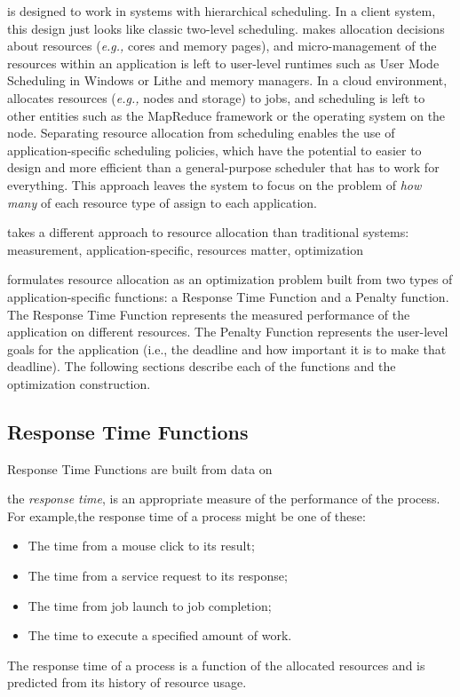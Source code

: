 \pacora is designed to work in systems with hierarchical scheduling.  In a client system, this design just looks like classic two-level scheduling.  \pacora makes allocation decisions about resources (\emph{e.g.,} cores and memory pages), and micro-management of the resources within an application is left to user-level runtimes such as User Mode Scheduling in Windows\cite{um_sched} or Lithe\cite{lithe} and memory managers.  In a cloud environment, \pacora allocates resources (\emph{e.g.,} nodes and storage) to jobs, and scheduling is left to other entities such as the MapReduce framework\cite{mapreduce} or the operating system on the node.  Separating resource allocation from scheduling enables the use of application-specific scheduling policies, which have the potential to easier to design and more efficient than a general-purpose scheduler that has to work for everything.   This approach leaves the system to focus on the problem of \emph{how many} of each resource type of assign to each application. 

 
\pacora takes a different approach to resource allocation than traditional systems: measurement, application-specific, resources matter, optimization 


\pacora formulates resource allocation as an optimization problem built from two types of application-specific functions: a Response Time Function and a Penalty function. The Response Time Function represents the measured performance of the application on different resources.  The Penalty Function represents the user-level goals for the application (i.e., the deadline and how important it is to make that deadline). The following sections describe each of the functions and the optimization construction.

\subsection*{Response Time Functions}

Response Time Functions are built from data on 

 the \emph{response time},
    is an appropriate measure of the performance of the process.
    For example,the response time of a process might be one of these:
    \begin{itemize}[noitemsep]
    \item The time from a mouse click to its result;
    \item The time from a service request to its response;
    \item The time from job launch to job completion;
    \item The time to execute a specified amount of work.
    \end{itemize}
The response time of a process is a function of the allocated resources and is predicted from its history of resource usage.

